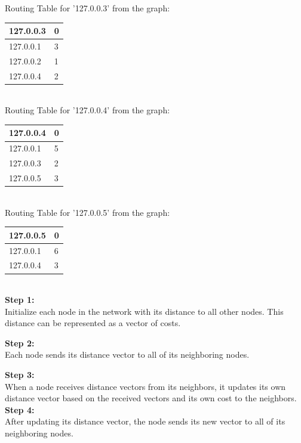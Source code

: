 \documentclass[11pt]{article}
\begin{document}
Routing Table for '127.0.0.3' from the graph:\\[12pt] 
\begin{tabular}{ | m{8em} | m{5cm}| } 
    \hline
   127.0.0.3 & 0\\ 
  \hline
  127.0.0.1 & 3\\ 
  \hline
  127.0.0.2 & 1\\ 
  \hline
  127.0.0.4 & 2\\ 
  \hline
\end{tabular}\\[24pt]


Routing Table for '127.0.0.4' from the graph:\\[12pt] 
\begin{tabular}{ | m{8em} | m{5cm}| } 
    \hline
   127.0.0.4 & 0\\ 
  \hline
  127.0.0.1 & 5\\ 
  \hline
  127.0.0.3 & 2\\ 
  \hline
  127.0.0.5 & 3\\ 
  \hline
\end{tabular}\\[24pt]


Routing Table for '127.0.0.5' from the graph:\\[12pt]  
\begin{tabular}{ | m{8em} | m{5cm}| } 
    \hline
   127.0.0.5 & 0\\ 
  \hline
  127.0.0.1 & 6\\ 
  \hline
  127.0.0.4 & 3\\ 
  \hline
\end{tabular}\\[24pt]

\textbf{Step 1: }\\[12pt]
Initialize each node in the network with its distance to all other nodes. This distance can be represented as a vector of costs.


\textbf{Step 2: }\\[12pt]
Each node sends its distance vector to all of its neighboring nodes.

\textbf{Step 3: }\\[12pt]
When a node receives distance vectors from its neighbors, it updates its own distance vector based on the received vectors and its own cost to the neighbors.\\[12pt]

\textbf{Step 4: }\\[12pt]
After updating its distance vector, the node sends its new vector to all of its neighboring nodes.\\[12pt]
\end{document}
